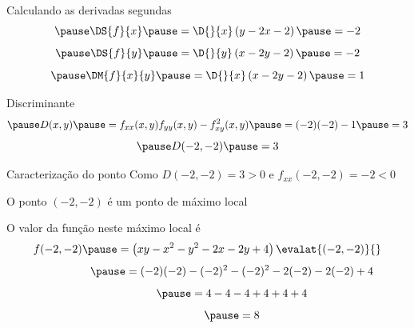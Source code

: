 \begin{resolution}{Calculando as derivadas segundas}
  \[
    \pause
    \DS{f}{x}
    \pause
    = \D{}{x}\left(y -2x -2\right)
    \pause
    = -2
  \]
  \[
    \pause
    \DS{f}{y}
    \pause
    = \D{}{y}\left(x -2y -2\right)
    \pause
    = -2
  \]
  \[
    \pause
    \DM{f}{x}{y}
    \pause
    = \D{}{x}\left(x -2y -2\right)
    \pause
    = 1
  \]

  \pause
  Discriminante
  \[
    \pause
    D(x, y)
    \pause
    = f_{xx}(x, y) f_{yy}(x, y) - f^2_{xy}(x, y)
    \pause
    = (-2)(-2) - 1
    \pause
    = 3
  \]
  \[
  \pause
    D(-2, -2)
    \pause
    = 3
  \]
\end{resolution}

\begin{resolution}{Caracterização do ponto}
  Como \(D(-2, -2)=3>0\)
  \pause
  e  \(f_{xx}(-2, -2) = -2 < 0\)

  \pause
  \vspace{\baselineskip}
  O ponto \((-2, -2)\) é um ponto de máximo local

  \pause
  \vspace{\baselineskip}
  O valor da função neste máximo local é
  \[
    f(-2, -2)
    \pause
    = \left(xy -x^2 - y^2 -2x -2y +4\right)\evalat{(-2, -2)}{}
  \]
  \[
    \hphantom{f(-2, -2)}
    \pause
    = (-2)(-2) - (-2)^2 - (-2)^2 -2(-2) -2(-2) + 4
  \]
  \[
    \hphantom{f(-2, -2)}
    \pause
    = 4 -4 -4 +4 +4 + 4
  \]
  \[
    \hphantom{f(-2, -2)}
    \pause
    = 8
  \]
\end{resolution}

